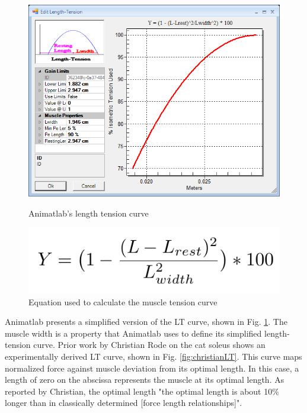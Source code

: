 \documentclass[runningheads,a4paper]{llncs}
\begin{document}
				\begin{figure}
					\centering
					\begin{minipage}{0.68\textwidth}
						\centering
						\includegraphics[width=\textwidth]{lwidth5.PNG}
						\caption{Animatlab's length tension curve}
						\label{fig:animatlabLT}
					\end{minipage}\hfill
					\begin{minipage}{0.28\textwidth}
						\centering
						\includegraphics[width=\textwidth]{lwidth2.PNG}
						\caption{Equation used to calculate the muscle tension curve}
					\end{minipage}
				\end{figure}
		Animatlab presents a simplified version of the LT curve, shown in Fig. \ref{fig:animatlabLT}. The muscle width is a property that Animatlab uses to define its simplified length-tension curve. Prior work by Christian Rode on the cat soleus shows an experimentally derived LT curve, shown in Fig. \ref{fig:christianLT}. This curve maps normalized force against muscle deviation from its optimal length. In this case, a length of zero on the abscissa represents the muscle at its optimal length. As reported by Christian, the optimal length "the optimal length is about 10\% longer than in classically determined [force length relationships]". \par
\end{document}
